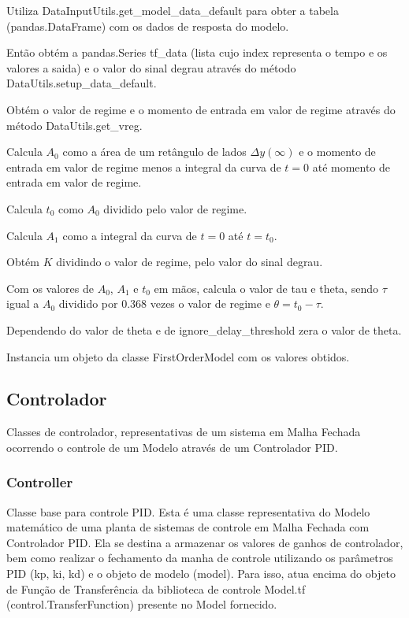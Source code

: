\begin{alineas}
    \item Utiliza DataInputUtils.get\_model\_data\_default para obter a tabela (pandas.DataFrame) com os dados de resposta do modelo.
    \item Então obtém a pandas.Series tf\_data (lista cujo index representa o tempo e os valores a saida) e o valor do sinal degrau através do método DataUtils.setup\_data\_default.
    \item Obtém o valor de regime e o momento de entrada em valor de regime através do método DataUtils.get\_vreg.
    \item Calcula $A_0$ como a área de um retângulo de lados $\Delta y(\infty)$ e o momento de entrada em valor de regime menos a integral da curva de $t = 0$ até momento de entrada em valor de regime.
    \item Calcula $t_0$ como $A_0$ dividido pelo valor de regime.
    \item Calcula $A_1$ como a integral da curva de $t = 0$ até $t = t_0$.
    \item Obtém $K$ dividindo o valor de regime, pelo valor do sinal degrau.
    \item Com os valores de $A_0$, $A_1$ e $t_0$ em mãos, calcula o valor de tau e theta, sendo $\tau$ igual a $A_0$ dividido por 0.368 vezes o valor de regime e $\theta = t_0 - \tau$.
    \item Dependendo do valor de theta e de ignore\_delay\_threshold zera o valor de theta.
    \item Instancia um objeto da classe FirstOrderModel com os valores obtidos.
\end{alineas}

\subsection{Controlador}

Classes de controlador, representativas de um sistema em Malha Fechada ocorrendo o controle de um Modelo através de um
Controlador PID\@.

\subsubsection{Controller}\label{subsubsec:devController}

Classe base para controle PID\@.
Esta é uma classe representativa do Modelo matemático de uma planta de sistemas de controle em Malha Fechada com
Controlador PID\@.
Ela se destina a armazenar os valores de ganhos de controlador, bem como realizar o fechamento da manha de controle
utilizando os parâmetros PID (kp, ki, kd) e o objeto de modelo (model).
Para isso, atua encima do objeto de Função de Transferência da biblioteca de controle Model.tf
(control.TransferFunction) presente no Model fornecido.

